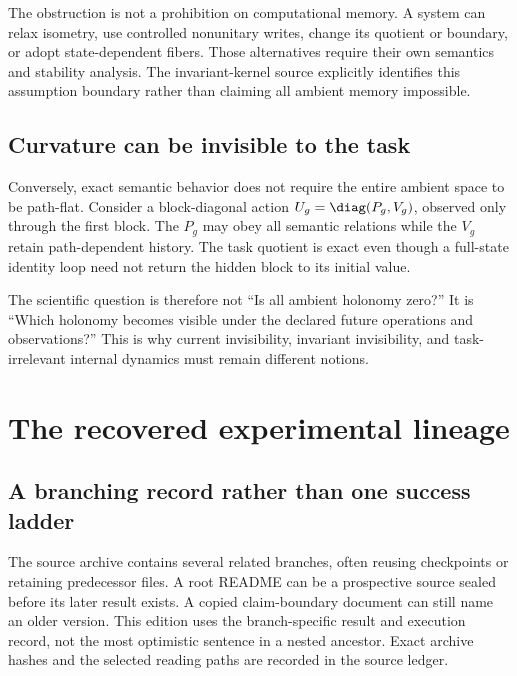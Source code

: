 \documentclass[11pt]{article}
\begin{document}
The obstruction is not a prohibition on computational memory. A system can relax isometry, use controlled nonunitary writes, change its quotient or boundary, or adopt state-dependent fibers. Those alternatives require their own semantics and stability analysis. The invariant-kernel source explicitly identifies this assumption boundary rather than claiming all ambient memory impossible. \cite{nik}

\subsection{Curvature can be invisible to the task}
Conversely, exact semantic behavior does not require the entire ambient space to be path-flat. Consider a block-diagonal action \(U_g=\diag(P_g,V_g)\), observed only through the first block. The \(P_g\) may obey all semantic relations while the \(V_g\) retain path-dependent history. The task quotient is exact even though a full-state identity loop need not return the hidden block to its initial value.

The scientific question is therefore not ``Is all ambient holonomy zero?'' It is ``Which holonomy becomes visible under the declared future operations and observations?'' This is why current invisibility, invariant invisibility, and task-irrelevant internal dynamics must remain different notions.

\section{The recovered experimental lineage}
\subsection{A branching record rather than one success ladder}
The source archive contains several related branches, often reusing checkpoints or retaining predecessor files. A root README can be a prospective source sealed before its later result exists. A copied claim-boundary document can still name an older version. This edition uses the branch-specific result and execution record, not the most optimistic sentence in a nested ancestor. Exact archive hashes and the selected reading paths are recorded in the source ledger.
\end{document}
